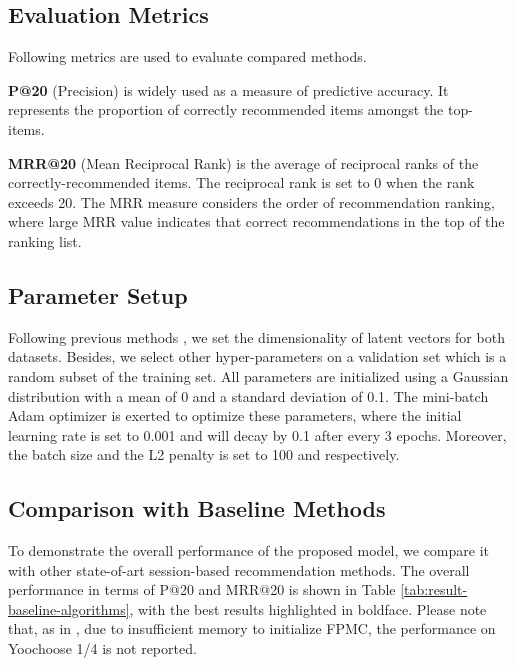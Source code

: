 \documentclass[letterpaper]{article} \usepackage{cite}
\begin{document}
\subsection{Evaluation Metrics}

Following metrics are used to evaluate compared methods.

{\bf P@20} (Precision) is widely used as a measure of predictive accuracy. It represents the proportion of correctly recommended items amongst the top- items.

{\bf MRR@20} (Mean Reciprocal Rank) is the average of reciprocal ranks of the correctly-recommended items. The reciprocal rank is set to 0 when the rank exceeds 20. The MRR measure considers the order of recommendation ranking, where large MRR value indicates that correct recommendations in the top of the ranking list.

\subsection{Parameter Setup}

Following previous methods \cite{Li:2017:NAS:3132847.3132926,Liu:2018:SSA:3219819.3219950}, we set the dimensionality of latent vectors  for both datasets. Besides, we select other hyper-parameters on a validation set which is a random  subset of the training set. All parameters are initialized using a Gaussian distribution with a mean of 0 and a standard deviation of 0.1. The mini-batch Adam optimizer is exerted to optimize these parameters, where the initial learning rate is set to 0.001 and will decay by 0.1 after every 3 epochs. Moreover, the batch size and the L2 penalty is set to 100 and  respectively.

\subsection{Comparison with Baseline Methods}

To demonstrate the overall performance of the proposed model, we compare it with other state-of-art session-based recommendation methods. The overall performance in terms of {\sc P@20} and {\sc MRR@20} is shown in Table \ref{tab:result-baseline-algorithms}, with the best results highlighted in boldface. Please note that, as in \cite{Li:2017:NAS:3132847.3132926}, due to insufficient memory to initialize FPMC, the performance on Yoochoose 1/4 is not reported.
\end{document}
